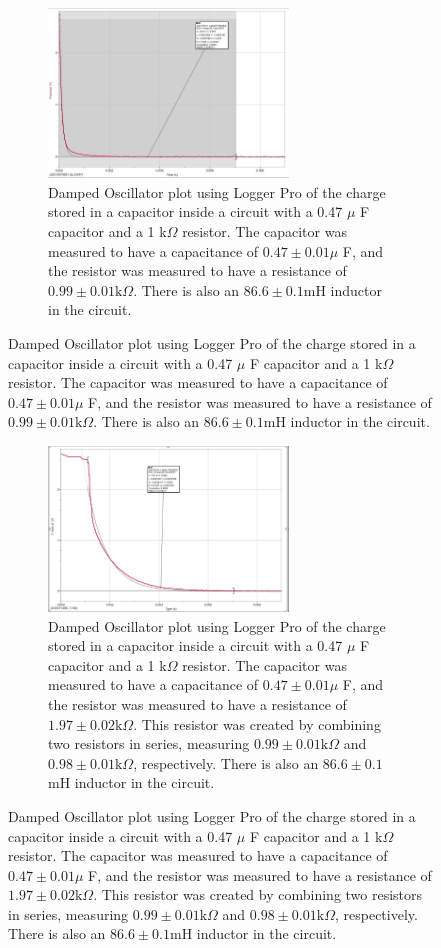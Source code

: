 \documentclass[12pt]{article}
\begin{document}
\begin{figure} [h]
    \begin{subfigure}
        \centering
        \includegraphics[width=0.7\textwidth]{figures/images/LCR_D5_Logger-Plot.jpg}
        \caption{Damped Oscillator plot using Logger Pro of the charge stored in a capacitor inside a circuit with a 0.47 $\mu$ F capacitor and a 1 k$\Omega$ resistor. The capacitor was measured to have a capacitance of $0.47\pm0.01\mu$ F, and the resistor was measured to have a resistance of $0.99\pm0.01\text{k}\Omega$. There is also an $86.6\pm0.1$mH inductor in the circuit.}
        \label{fig:D5_47C_1000R}
    \end{subfigure}
\end{figure}

\begin{figure} [h]
    \begin{subfigure}
        \centering
        \includegraphics[width=0.7\textwidth]{figures/images/LCR_D6_Logger-Plot.jpg}
        \caption{Damped Oscillator plot using Logger Pro of the charge stored in a capacitor inside a circuit with a 0.47 $\mu$ F capacitor and a 1 k$\Omega$ resistor. The capacitor was measured to have a capacitance of $0.47\pm0.01\mu$ F, and the resistor was measured to have a resistance of $1.97\pm0.02\text{k}\Omega$. This resistor was created by combining two resistors in series, measuring $0.99\pm0.01\text{k}\Omega$ and $0.98\pm0.01\text{k}\Omega$, respectively. There is also an $86.6\pm0.1$mH inductor in the circuit.}
        \label{fig:D6_47C_2000R}
    \end{subfigure}
\end{figure}
\end{document}
